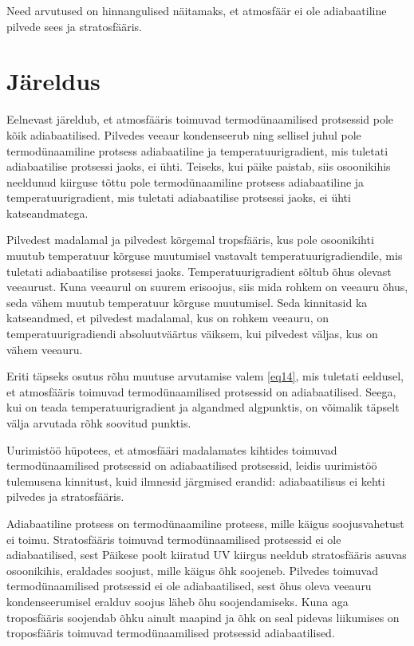 \documentclass{trkut}%
\begin{document}
Need arvutused on hinnangulised näitamaks, et atmosfäär ei ole adiabaatiline pilvede sees ja stratosfääris.


\section{Järeldus}
Eelnevast järeldub, et atmosfääris toimuvad termodünaamilised protsessid pole kõik adiabaatilised. Pilvedes veeaur kondenseerub ning sellisel juhul pole termodünaamiline protsess adiabaatiline ja temperatuurigradient, mis tuletati adiabaatilise protsessi jaoks, ei ühti. Teiseks, kui päike paistab, siis osoonikihis neeldunud kiirguse tõttu pole termodünaamiline protsess adiabaatiline ja temperatuurigradient, mis tuletati adiabaatilise protsessi jaoks, ei ühti katseandmatega.

Pilvedest madalamal ja pilvedest kõrgemal tropsfääris, kus pole osoonikihti muutub temperatuur kõrguse muutumisel vastavalt temperatuurigradiendile, mis tuletati adiabaatilise protsessi jaoks. Temperatuurigradient sõltub õhus olevast veeaurust. Kuna veeaurul on suurem erisoojus, siis mida rohkem on veeauru õhus, seda vähem muutub temperatuur kõrguse muutumisel. Seda kinnitasid ka katseandmed, et pilvedest madalamal, kus on rohkem veeauru, on temperatuurigradiendi absoluutväärtus väiksem, kui pilvedest väljas, kus on vähem veeauru.

Eriti täpseks osutus rõhu muutuse arvutamise valem \ref{eq14}, mis tuletati eeldusel, et atmosfääris toimuvad termodünaamilised protsessid on adiabaatilised. Seega, kui on teada temperatuurigradient ja algandmed algpunktis, on võimalik täpselt välja arvutada rõhk soovitud punktis.


Uurimistöö hüpotees, et atmosfääri madalamates kihtides toimuvad termodünaamilised protsessid on adiabaatilised protsessid, leidis uurimistöö tulemusena kinnitust, kuid ilmnesid järgmised erandid: adiabaatilisus ei kehti pilvedes ja stratosfääris. 

Adiabaatiline protsess on termodünaamiline protsess, mille käigus soojusvahetust ei toimu. Stratosfääris toimuvad termodünaamilised protsessid ei ole adiabaatilised, sest Päikese poolt kiiratud UV kiirgus neeldub stratosfääris asuvas osoonikihis, eraldades soojust, mille käigus õhk soojeneb. Pilvedes toimuvad termodünaamilised protsessid ei ole adiabaatilised, sest õhus oleva veeauru kondenseerumisel eralduv soojus läheb õhu soojendamiseks. Kuna aga troposfääris soojendab õhku ainult maapind ja õhk on seal pidevas liikumises on troposfääris toimuvad termodünaamilised protsessid adiabaatilised.
\end{document}
